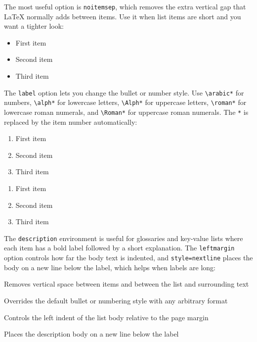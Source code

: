 	The most useful option is \texttt{noitemsep}, which removes the extra vertical gap that \LaTeX{} normally adds between items. Use it when list items are short and you want a tighter look:
	
	\begin{itemize}[noitemsep]
		\item First item
		\item Second item
		\item Third item
	\end{itemize}
	
	The \texttt{label} option lets you change the bullet or number style. Use \texttt{\textbackslash arabic*} for numbers, \texttt{\textbackslash alph*} for lowercase letters, \texttt{\textbackslash Alph*} for uppercase letters, \texttt{\textbackslash roman*} for lowercase roman numerals, and \texttt{\textbackslash Roman*} for uppercase roman numerals. The \texttt{*} is replaced by the item number automatically:
	
	\begin{enumerate}[label=\textbf{\arabic*.}, noitemsep]
		\item First item
		\item Second item
		\item Third item
	\end{enumerate}
	
	\begin{enumerate}[label=(\alph*), noitemsep]
		\item First item
		\item Second item
		\item Third item
	\end{enumerate}
	
	The \texttt{description} environment is useful for glossaries and key-value lists where each item has a bold label followed by a short explanation. The \texttt{leftmargin} option controls how far the body text is indented, and \texttt{style=nextline} places the body on a new line below the label, which helps when labels are long:
	
	\begin{description}[leftmargin=3cm, style=nextline]
		\item[\texttt{noitemsep}] Removes vertical space between items and between the list and surrounding text
		\item[\texttt{label}] Overrides the default bullet or numbering style with any arbitrary format
		\item[\texttt{leftmargin}] Controls the left indent of the list body relative to the page margin
		\item[\texttt{style=nextline}] Places the description body on a new line below the label
	\end{description}
	
